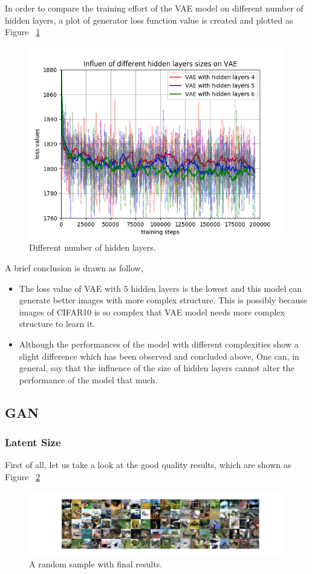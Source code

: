 \documentclass[12pt,letterpaper]{article}
\begin{document}
In order to compare the training effort of the VAE model on different number of hidden layers, a plot of generator loss function value is created and plotted as Figure ~\ref{fig:vae_hidden_CIFAR}

\begin{figure}[h]
    \centering
    \includegraphics[width=.5\linewidth]{VAE_CIFAR_hidden.png}
    \caption{\small Different number of hidden layers.}
    \label{fig:vae_hidden_CIFAR}
\end{figure}

A brief conclusion is drawn as follow,
\begin{itemize}
    \item The loss value of VAE with 5 hidden layers is the lowest and this model can generate better images with more complex structure. This is possibly because images of CIFAR10 is so complex that VAE model needs more complex structure to learn it.
    \item Although the performances of the model with different complexities show a slight difference which has been observed and concluded above, One can, in general, say that the influence of the size of hidden layers cannot alter the performance of the model that much.
\end{itemize}


\subsection{GAN}

\subsubsection{Latent Size}

First of all, let us take a look at the good quality results, which are shown as Figure ~\ref{fig:CIFAR_GAN_latent_results} 

\begin{figure}[h]
    \centering
    \includegraphics[width=.8\linewidth]{GAN_CIFAR_0_10_256.png}
    \caption{\small A random sample with final results.}
    \label{fig:CIFAR_GAN_latent_results}
\end{figure}
\end{document}
